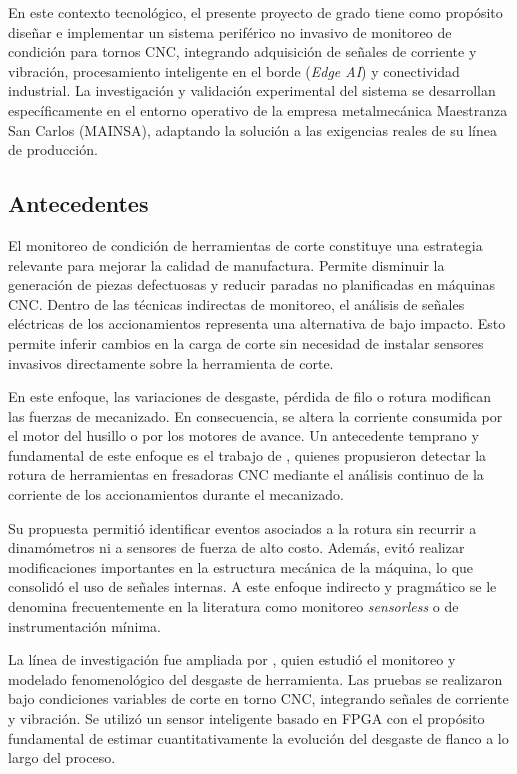 En este contexto tecnológico, el presente proyecto de grado tiene como propósito diseñar e implementar un sistema periférico no invasivo de monitoreo de condición para tornos CNC, integrando adquisición de señales de corriente y vibración, procesamiento inteligente en el borde (\textit{Edge AI}) y conectividad industrial. La investigación y validación experimental del sistema se desarrollan específicamente en el entorno operativo de la empresa metalmecánica Maestranza San Carlos (MAINSA), adaptando la solución a las exigencias reales de su línea de producción.

\subsection{Antecedentes}
\label{subsec:antecedentes}

El monitoreo de condición de herramientas de corte constituye una estrategia relevante para mejorar la calidad de manufactura. Permite disminuir la generación de piezas defectuosas y reducir paradas no planificadas en máquinas CNC. Dentro de las técnicas indirectas de monitoreo, el análisis de señales eléctricas de los accionamientos representa una alternativa de bajo impacto. Esto permite inferir cambios en la carga de corte sin necesidad de instalar sensores invasivos directamente sobre la herramienta de corte.

En este enfoque, las variaciones de desgaste, pérdida de filo o rotura modifican las fuerzas de mecanizado. En consecuencia, se altera la corriente consumida por el motor del husillo o por los motores de avance. Un antecedente temprano y fundamental de este enfoque es el trabajo de \cite{romero2003}, quienes propusieron detectar la rotura de herramientas en fresadoras CNC mediante el análisis continuo de la corriente de los accionamientos durante el mecanizado.

Su propuesta permitió identificar eventos asociados a la rotura sin recurrir a dinamómetros ni a sensores de fuerza de alto costo. Además, evitó realizar modificaciones importantes en la estructura mecánica de la máquina, lo que consolidó el uso de señales internas. A este enfoque indirecto y pragmático se le denomina frecuentemente en la literatura como monitoreo \textit{sensorless} o de instrumentación mínima.

La línea de investigación fue ampliada por \cite{trejo2010}, quien estudió el monitoreo y modelado fenomenológico del desgaste de herramienta. Las pruebas se realizaron bajo condiciones variables de corte en torno CNC, integrando señales de corriente y vibración. Se utilizó un sensor inteligente basado en FPGA con el propósito fundamental de estimar cuantitativamente la evolución del desgaste de flanco a lo largo del proceso.


